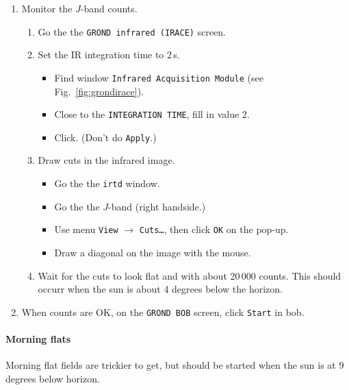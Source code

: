 \documentclass[11pt,fleqn]{book} %
\begin{document}
\begin{enumerate}
  \item Monitor the $J$-band counts.
        \begin{enumerate}
           \item Go the the \texttt{GROND infrared (IRACE)} screen.
           \item Set the IR integration time to 2\,s.
              \begin{itemize} 
                 \item Find window \texttt{Infrared Acquisition Module} (see Fig.~\ref{fig:grondirace}).
                 \item Close to the \texttt{INTEGRATION TIME}, fill in value 2.
                 \item Click. (Don't do \texttt{Apply}.)
              \end{itemize}
           \item Draw cuts in the infrared image.
              \begin{itemize}
                 \item Go the the \texttt{irtd} window.
                 \item Go the the $J$-band (right handside.)
                 \item Use menu \texttt{View} $\rightarrow$ \texttt{Cuts…}, then click \texttt{OK} on the pop-up.
                 \item Draw a diagonal on the image with the mouse.
              \end{itemize}
           \item Wait for the cuts to look flat and with about 20\,000 counts. This should occurr when the sun is about 4 degrees below the horizon.
        \end{enumerate}
  \item When counts are OK, on the \texttt{GROND BOB} screen, click \texttt{Start} in \gls{bob}. 
\end{enumerate}

\paragraph{Morning flats}
Morning flat fields are trickier to get, but should be started when the sun is
at 9 degrees below horizon.
\end{document}
